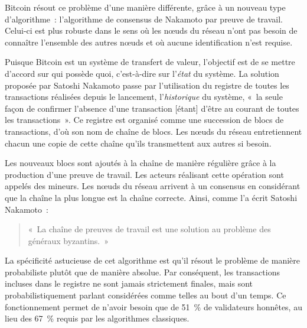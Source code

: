

Bitcoin résout ce problème d'une manière différente, grâce à un nouveau type d'algorithme~: l'algorithme de consensus de Nakamoto par preuve de travail. Celui-ci est plus robuste dans le sens où les nœuds du réseau n'ont pas besoin de connaître l'ensemble des autres nœuds et où aucune identification n'est requise.

Puisque Bitcoin est un système de transfert de valeur, l'objectif est de se mettre d'accord sur qui possède quoi, c'est-à-dire sur l'\emph{état} du système. La solution proposée par Satoshi Nakamoto passe par l'utilisation du registre de toutes les transactions réalisées depuis le lancement, l'\emph{historique} du système, «~la seule façon de confirmer l'absence d'une transaction [étant] d'être au courant de toutes les transactions~». Ce registre est organisé comme une succession de blocs de transactions, d'où son nom de chaîne de blocs. Les nœuds du réseau entretiennent chacun une copie de cette chaîne qu'ils transmettent aux autres si besoin.

Les nouveaux blocs sont ajoutés à la chaîne de manière régulière grâce à la production d'une preuve de travail. Les acteurs réalisant cette opération sont appelés des mineurs. Les nœuds du réseau arrivent à un consensus en considérant que la chaîne la plus longue est la chaîne correcte. Ainsi, comme l'a écrit Satoshi Nakamoto~:

\begin{quote}
«~La chaîne de preuves de travail est une solution au problème des généraux byzantins.~»
\end{quote}

La spécificité astucieuse de cet algorithme est qu'il résout le problème de manière probabiliste plutôt que de manière absolue. Par conséquent, les transactions incluses dans le registre ne sont jamais strictement finales, mais sont probabilistiquement parlant considérées comme telles au bout d'un temps. Ce fonctionnement permet de n'avoir besoin que de 51~\% de validateurs honnêtes, au lieu des 67~\% requis par les algorithmes classiques.

